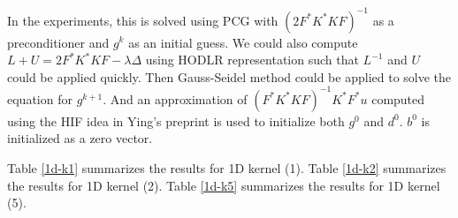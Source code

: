 \documentclass[11pt]{article}
\begin{document}
In the experiments, this is solved using PCG with $(2 F^* K^* K F )^{-1}$ as a preconditioner and $g^{k}$ as an initial guess. We could also compute  $L + U = 2 F^* K^* K F - \lambda \Delta$ using HODLR representation such that $L^{-1}$ and $U$ could be applied quickly. Then Gauss-Seidel method could be applied to solve the equation for $g^{k+1}$. And an approximation of $(F^* K^* K F)^{-1}K^* F^* u$ computed using the HIF idea in Ying's preprint is used to initialize both $g^{0}$ and $d^{0}$. $b^{0}$ is initialized as a zero vector.

Table \ref{1d-k1} summarizes the results for 1D kernel (1).
Table \ref{1d-k2} summarizes the results for 1D kernel (2).
Table \ref{1d-k5} summarizes the results for 1D kernel (5).



%
%
%
\end{document}
